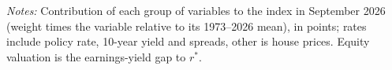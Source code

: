 \begin{table}[tbp]\centering\small
\caption{Contributions to the Readings for September 2026, Relative to $r^*$}\label{tab:latestgroups}
\begin{flushleft}\footnotesize\textit{Notes:} Contribution of each group of variables to the index in September 2026 (weight times the variable relative to its 1973--2026 mean), in points; rates include policy rate, 10-year yield and spreads, other is house prices. Equity valuation is the earnings-yield gap to $r^*$.\end{flushleft}
\end{table}
